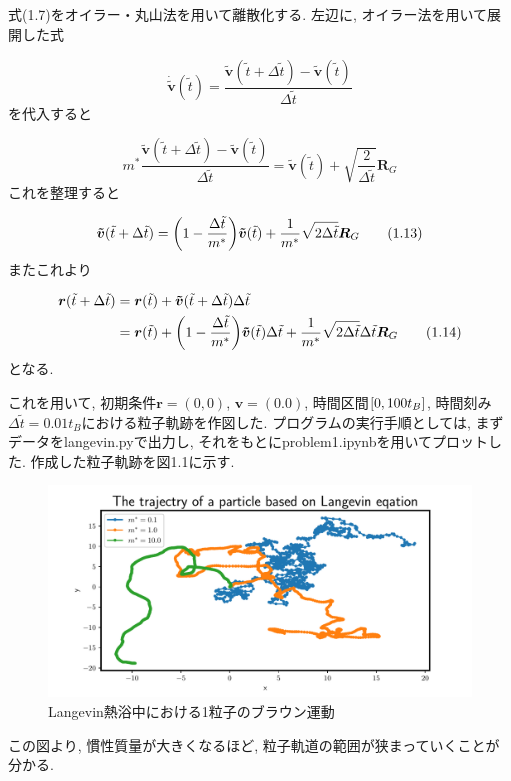 \documentclass[a4paper,dvipdfmx]{jarticle}
\begin{document}
\newpage


\subsection{}
\noindent
式(1.7)をオイラー・丸山法を用いて離散化する.
左辺に, オイラー法を用いて展開した式

\begin{equation}
    \bm{\dot{\tilde{v}}}(\tilde{t}) 
    = \frac{\bm{\tilde{v}}(\tilde{t}+\Delta \tilde{t})-\bm{\tilde{v}}(\tilde{t})}{\Delta \tilde{t}}
    \tag{1.11}
\end{equation}
を代入すると

\begin{equation}
    m^* \frac{\bm{\tilde{v}}(\tilde{t}+\Delta \tilde{t})-\bm{\tilde{v}}(\tilde{t})}{\Delta \tilde{t}}
    = \bm{\tilde{v}}(\tilde{t}) + \sqrt{\frac{2}{\Delta \tilde{t}}}\bm{R}_G \tag{1.12}
\end{equation}
これを整理すると

\begin{equation}    
    \bm{\tilde{v}}(\tilde{t}+\Delta \tilde{t}) = \qty(1-\frac{\Delta \tilde{t}}{m^*})\bm{\tilde{v}}(\tilde{t})
    + \frac{1}{m^*}\sqrt{2\Delta \tilde{t}}\bm{R}_G  \tag{1.13}
\end{equation}
またこれより

\begin{align*}
    \bm{r}(\tilde{t}+\Delta \tilde{t}) &= \bm{r}(\tilde{t}) + \bm{\tilde{v}}(\tilde{t}+\Delta \tilde{t})\Delta \tilde{t} \\
    &= \bm{r}(\tilde{t}) + \qty(1-\frac{\Delta \tilde{t}}{m^*})\bm{\tilde{v}}(\tilde{t})\Delta \tilde{t}
    + \frac{1}{m^*}\sqrt{2\Delta \tilde{t}}\Delta \tilde{t}\bm{R}_G \tag{1.14}
\end{align*}
となる.

\noindent
これを用いて, 初期条件$\bm{r}=(0,0)$, $\bm{v}=(0.0)$, 時間区間$\qty[0, 100t_B]$, 時間刻み$\Delta \tilde{t}=0.01t_B$における粒子軌跡を作図した.
プログラムの実行手順としては, まずデータをlangevin.pyで出力し, それをもとにproblem1.ipynbを用いてプロットした.
作成した粒子軌跡を図1.1に示す.

\begin{figure}[H]
    \centering
    \includegraphics[scale=0.6]{problem_1/1-4/problem1-4.pdf}
    \caption{Langevin熱浴中における1粒子のブラウン運動}
\end{figure}
この図より, 慣性質量が大きくなるほど, 粒子軌道の範囲が狭まっていくことが分かる.
\end{document}
